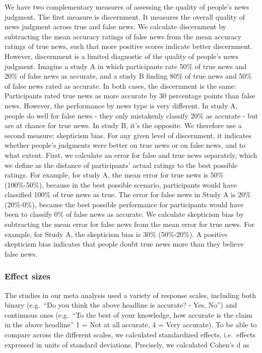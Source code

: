 \documentclass[
  man]{apa6}
\begin{document}
We have two complementary measures of assessing the quality of people's news judgment. The first measure is discernment. It measures the overall quality of news judgment across true and false news. We calculate discernment by subtracting the mean accuracy ratings of false news from the mean accuracy ratings of true news, such that more positive scores indicate better discernment. However, discernment is a limited diagnostic of the quality of people's news judgment. Imagine a study A in which participants rate 50\% of true news and 20\% of false news as accurate, and a study B finding 80\% of true news and 50\% of false news rated as accurate. In both cases, the discernment is the same: Participants rated true news as more accurate by 30 percentage points than false news. However, the performance by news type is very different. In study A, people do well for false news - they only mistakenly classify 20\% as accurate - but are at chance for true news. In study B, it's the opposite. We therefore use a second measure: skepticism bias. For any given level of discernment, it indicates whether people's judgments were better on true news or on false news, and to what extent. First, we calculate an error for false and true news separately, which we define as the distance of participants' actual ratings to the best possible ratings. For example, for study A, the mean error for true news is 50\% (100\%-50\%), because in the best possible scenario, participants would have classified 100\% of true news as true. The error for false news in Study A is 20\% (20\%-0\%), because the best possible performance for participants would have been to classify 0\% of false news as accurate. We calculate skepticism bias by subtracting the mean error for false news from the mean error for true news. For example, for Study A, the skepticism bias is 30\% (50\%-20\%). A positive skepticism bias indicates that people doubt true news more than they believe false news.

\subsubsection{Effect sizes}\label{effect-sizes}

The studies in our meta analysis used a variety of response scales, including both binary (e.g.~``Do you think the above headline is accurate? - Yes, No'') and continuous ones (e.g.~``To the best of your knowledge, how accurate is the claim in the above headline'' 1 = Not at all accurate, 4 = Very accurate). To be able to compare across the different scales, we calculated standardized effects, i.e.~effects expressed in units of standard deviations. Precisely, we calculated Cohen's d as
\end{document}
